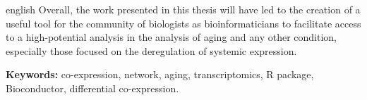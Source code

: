 \begin{otherlanguage*}{english}
Overall, the work presented in this thesis will have led to the creation of a useful tool for the community of biologists as bioinformaticians to facilitate access to a high-potential analysis in the analysis of aging and any other condition, especially those focused on the deregulation of systemic expression.

\textbf{Keywords:} co-expression, network, aging, transcriptomics, R package, Bioconductor, differential co-expression.
\end{otherlanguage*}
